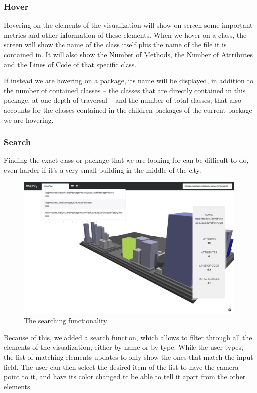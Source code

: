 \documentclass[]{usiinfbachelorproject}
\begin{document}
\subsubsection{Hover} \label{Hover}
Hovering on the elements of the visualization will show on screen some important metrics and other information of these elements.
When we hover on a class, the screen will show the name of the class itself plus the name of the file it is contained in. It will also show the Number of Methods,
 the Number of Attributes and the Lines of Code of that specific class.

 If instead we are hovering on a package, its name will be displayed, in addition to the number of contained classes -- the classes that are directly contained in this package, at one depth of traversal --
  and the number of total classes, that also accounts for the classes contained in the children packages of the current package we are hovering.

\subsubsection{Search} \label{Search}
Finding the exact class or package that we are looking for can be difficult to do, even harder if it's a very small building in the middle of the city.

\begin{figure} [H]
\centering
\includegraphics[width=1\textwidth]{pictures/search.png}
\caption{The searching functionality}
\label{fig:search}
\end{figure}


Because of this, we added a search function, which allows to filter through all the elements of the visualization, either by name or by type. While the user types,
the list of matching elements updates to only show the ones that match the input field. The user can then select the desired item of the list to have the camera point to it,
and have its color changed to be able to tell it apart from the other elements.
\end{document}
